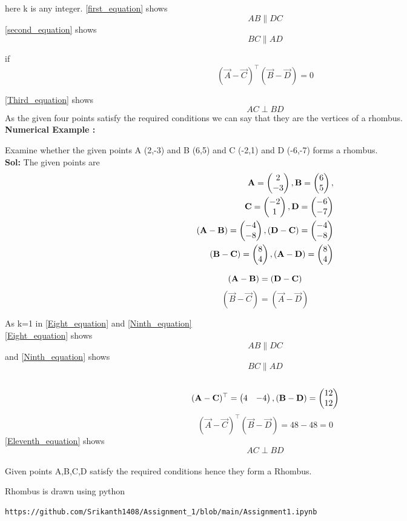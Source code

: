 \documentclass{article}
\begin{document}
{here k is any integer.}
\eqref{first_equation} shows 
$$AB \parallel DC $$
\eqref{second_equation} shows 
$$BC \parallel AD$$

if 
\begin{equation}\label{Third_equation}
(\vec{A}-\vec{C} )^ \top ( \vec{B}-\vec{D} ) = 0 
\end{equation}

\eqref{Third_equation} shows
$$AC \perp BD $$
{As the given four points satisfy the required conditions we can say that they are the vertices of a rhombus.}\\
\textbf{Numerical Example :}
 
{Examine whether the given points A (2,-3) and B (6,5) and C (-2,1) and D (-6,-7) forms a rhombus.}\\

 \textbf{Sol:}
 The given points are
\begin{align} 
\vec{A} = \myvec{2\\-3},\vec{B} =\myvec{6\\5},\\
\vec{C} =\myvec{-2\\1}, \vec{D} =\myvec{-6\\-7}\\
(\vec{A}-\vec{B} ) = \myvec{-4\\-8}, (\vec{D}-\vec{C} ) = \myvec{-4\\-8}\\
(\vec{B}-\vec{C} ) = \myvec{8\\4}, (\vec{A}-\vec{D} ) = \myvec{8\\4}
\end{align} 

\begin{equation}\label{Eight_equation}
(\vec{A}-\vec{B} ) = (\vec{D}-\vec{C} )  \\
\end{equation}
\begin{equation}\label{Ninth_equation}
(\vec{B}-\vec{C} )  = (\vec{A}-\vec{D} ) 
\end{equation}

{As k=1 in \eqref{Eight_equation} and \eqref{Ninth_equation}}\\

\eqref{Eight_equation} shows $$ AB  {\parallel} DC $$ and \eqref{Ninth_equation} shows $$BC \parallel AD $$\\
    
\begin{align}
(\vec{A}-\vec{C} )^\top = \myvec{4&-4 }
,(\vec{B}-\vec{D} ) = \myvec{12\\12}
\end{align}
\begin{equation}\label{Eleventh_equation}
(\vec{A}-\vec{C} )^ \top ( \vec{B}-\vec{D} ) = 48-48 = 0
\end{equation}
 \eqref{Eleventh_equation} shows
$$AC \perp BD $$\\ 
{Given points A,B,C,D satisfy the required 
conditions hence they form a Rhombus.}

{Rhombus is drawn using python}
\begin{lstlisting}
https://github.com/Srikanth1408/Assignment_1/blob/main/Assignment1.ipynb
\end{lstlisting}
\end{document}
